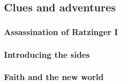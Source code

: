 \subsection{Clues and adventures}

\subsubsection{Assassination of Ratzinger I}

\subsubsection{Introducing the sides}

\subsubsection{Faith and the new world}







